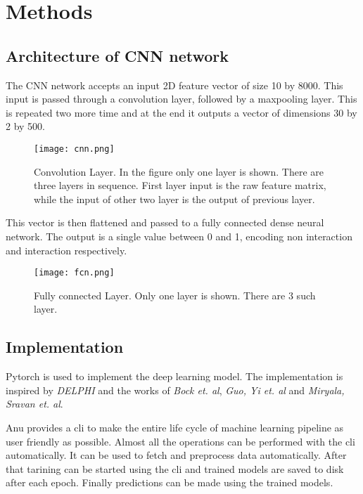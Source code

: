 \documentclass[../main.tex]{subfiles}
\begin{document}
\section{Methods}

\subsection{Architecture of CNN network}
The CNN network accepts an input 2D feature vector of size 10 by 8000.
This input is passed through a convolution layer, followed by a maxpooling layer.
This is repeated two more time and at the end it outputs a vector of dimensions 30 by 2 by 500.
\begin{figure}[H]
    \centering
    \texttt{[image: cnn.png]}
    \caption{Convolution Layer. In the figure only one layer is shown. There are three layers in
    sequence. First layer input is the raw feature matrix, while the input of other two layer is
    the output of previous layer.}
    \label{fig:cnn}
\end{figure}

This vector is then flattened and passed to a fully connected dense neural network.
The output is a single value between 0 and 1, encoding non interaction and interaction respectively.


\begin{figure}[H]
    \centering
    \texttt{[image: fcn.png]}
    \caption{Fully connected Layer. Only one layer is shown. There are 3 such layer.}
    \label{fig:fcn}
\end{figure}

\subsection{Implementation}
Pytorch is used to implement the deep learning model.
The implementation is inspired by \emph{DELPHI}
and the works of \emph{Bock et. al}, \emph{Guo, Yi et. al}
and \emph{Miryala, Sravan et. al}.

Anu provides a cli to make the entire life cycle of machine learning pipeline as user friendly as possible.
Almost all the operations can be performed with the cli automatically.
It can be used to fetch and preprocess data automatically.
After that tarining can be started using the cli and trained models are saved to disk after each epoch.
Finally predictions can be made using the trained models.
\end{document}
